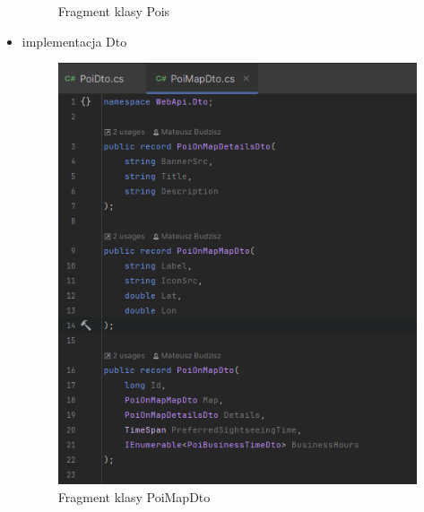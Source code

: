 \begin{itemize}
\begin{figure}[H]
            \caption{Fragment klasy Pois}
            \label{fig:figure7}
            \end{figure}
        \item implementacja Dto
        \begin{figure}[H]
            \centering
            \includegraphics[width=1\textwidth]{attachments/PoiMapDto}
            \caption{Fragment klasy PoiMapDto}
            \label{fig:figure}
            \end{figure}


\end{itemize}
